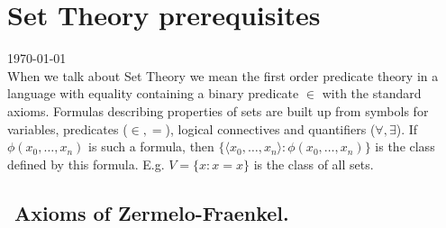 \cfoot{}\rhead{\thepage}

%


\thispagestyle{empty}

\section{Set Theory prerequisites}
{\tiny \today } \\[0.5cm]

When we talk about Set Theory we mean the first order predicate theory in a language with equality containing a binary predicate $\in$
with the standard axioms. Formulas describing properties of sets are built up from symbols for variables, predicates ($\in,=$),
logical connectives and quantifiers ($\forall,\exists$). If $\phi(x_0,\ldots,x_n)$ is such a formula, then $\{\langle x_0,\ldots, x_n\rangle:
\phi(x_0,\ldots,x_n)\}$ is the class defined by this formula. E.g. $V=\{x:x=x\}$ is the class of all sets.

\subsection{${}$ \hspace{-1em} Axioms of Zermelo-Fraenkel.}

